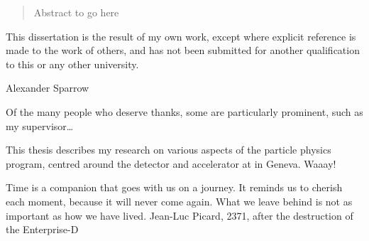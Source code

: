 


\begin{abstract}%
  Abstract to go here
\end{abstract}


\begin{declaration}
  This dissertation is the result of my own work, except where explicit
  reference is made to the work of others, and has not been submitted
  for another qualification to this or any other university.
  \vspace*{1cm}
  \begin{flushright}
    Alexander Sparrow
  \end{flushright}
\end{declaration}


\begin{acknowledgements}
  Of the many people who deserve thanks, some are particularly prominent,
  such as my supervisor\dots
\end{acknowledgements}


\begin{preface}
  This thesis describes my research on various aspects of the \LHCb
  particle physics program, centred around the \LHCb detector and \LHC
  accelerator at \CERN in Geneva. Waaay!

  \noindent
\end{preface}

\tableofcontents

\listoffigures
\listoftables

\frontquote%
{Time is a companion that goes with us on a journey. It reminds us to cherish
  each moment, because it will never come again. What we leave behind is not as
  important as how we have lived.}%
{Jean-Luc Picard, 2371, after the destruction of the Enterprise-D}
